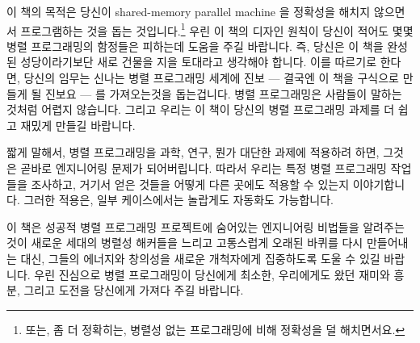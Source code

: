 

이 책의 목적은 당신이 shared-memory parallel machine 을 정확성을 해치지
않으면서 프로그램하는 것을 돕는 것입니다.\footnote{또는, 좀 더 정확히는, 병렬성
없는 프로그래밍에 비해 정확성을 덜 해치면서요.} 우린 이 책의 디자인 원칙이
당신이 적어도 몇몇 병렬 프로그래밍의 함정들은 피하는데 도움을 주길 바랍니다.
즉, 당신은 이 책을 완성된 성당이라기보단 새로 건물을 지을 토대라고 생각해야
합니다.  이를 따르기로 한다면, 당신의 임무는 신나는 병렬 프로그래밍 세계에 진보
--- 결국엔 이 책을 구식으로 만들게 될 진보요 --- 를 가져오는것을 돕는겁니다.
병렬 프로그래밍은 사람들이 말하는 것처럼 어렵지 않습니다. 그리고 우리는 이 책이
당신의 병렬 프로그래밍 과제를 더 쉽고 재밌게 만들길 바랍니다.

\iffalse
The purpose of this book is to help you program
shared-memory parallel machines without risking your sanity.\footnote{
	Or, perhaps more accurately, without much greater risk to your
	sanity than that incurred by non-parallel programming.
	Which, come to think of it, might not be saying all that much.}
We hope that this book's design principles will help you avoid at least some
parallel-programming pitfalls.
That said, you should think of this book as a foundation on which to build,
rather than as a completed cathedral.
Your mission, if you choose to accept, is to help make further progress
in the exciting field of parallel programming---progress that will
in time render this book obsolete.
Parallel programming is not as hard as some say, and we hope
that this book makes your parallel-programming projects easier and
more fun.
\fi

짧게 말해서, 병렬 프로그래밍을 과학, 연구, 뭔가 대단한 과제에 적용하려 하면,
그것은 곧바로 엔지니어링 문제가 되어버립니다.  따라서 우리는 특정 병렬
프로그래밍 작업들을 조사하고, 거기서 얻은 것들을 어떻게 다른 곳에도 적용할 수
있는지 이야기합니다.  그러한 적용은, 일부 케이스에서는 놀랍게도 자동화도
가능합니다.

\iffalse
In short, where parallel programming once focused on science, research,
and grand-challenge projects, it is quickly becoming an engineering
discipline.
We therefore examine specific parallel-programming tasks
and describe how to approach them.
In some surprisingly common cases, they can even be automated.
\fi

이 책은 성공적 병렬 프로그래밍 프로젝트에 숨어있는 엔지니어링 비법들을 알려주는
것이 새로운 세대의 병렬성 해커들을 느리고 고통스럽게 오래된 바퀴를 다시
만들어내는 대신, 그들의 에너지와 창의성을 새로운 개척자에게 집중하도록 도울 수
있길 바랍니다.
우린 진심으로 병렬 프로그래밍이 당신에게 최소한, 우리에게도 왔던 재미와 흥분,
그리고 도전을 당신에게 가져다 주길 바랍니다.

